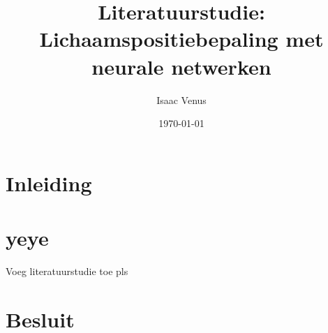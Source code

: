 \documentclass[a4paper,kulak]{kulakarticle} %
\date{\today}
\title{Literatuurstudie: Lichaamspositiebepaling met neurale netwerken}
\author{Isaac Venus}
\begin{document}
\maketitle

\section*{Inleiding}
\section{yeye}
Voeg literatuurstudie toe pls
\section*{Besluit}
\end{document}
